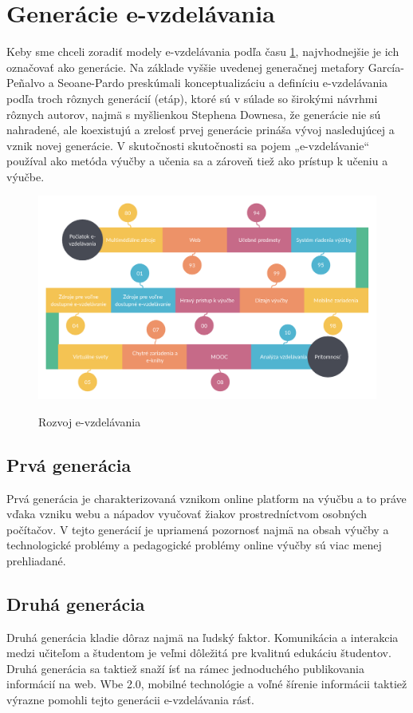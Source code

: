 \documentclass[10pt,slovak,a4paper]{article}
\begin{document}
\section{Generácie e-vzdelávania} \label{Generations}

	Keby sme chceli zoradiť modely e-vzdelávania podľa času \ref*{obrazok-casovyDiag}, najvhodnejšie je ich označovať ako generácie. Na základe vyššie uvedenej generačnej metafory García-Peñalvo a Seoane-Pardo preskúmali konceptualizáciu a definíciu e-vzdelávania podľa troch rôznych generácií (etáp), ktoré sú v súlade so širokými návrhmi rôznych autorov, najmä s myšlienkou Stephena Downesa, že generácie nie sú nahradené, ale koexistujú a zrelosť prvej generácie prináša vývoj nasledujúcej a vznik novej generácie. V skutočnosti skutočnosti sa pojem „e-vzdelávanie“ používal ako metóda výučby a učenia sa a zároveň tiež ako prístup k učeniu a výučbe.
	\cite{main}

	\begin{figure}
		\centering
		\includegraphics[width = \textwidth]{Obrazky/diagram.png}
		\caption{Rozvoj e-vzdelávania}
		\label{obrazok-casovyDiag}
		\cite{conole}
	\end{figure}

	\subsection{Prvá generácia}
	Prvá generácia je charakterizovaná vznikom online platform na výučbu a to práve vďaka vzniku webu a nápadov vyučovať žiakov prostredníctvom osobných počítačov. V tejto generácií je upriamená pozornosť najmä na obsah výučby a technologické problémy a pedagogické problémy online výučby sú viac menej prehliadané.
	\cite{main}

	\subsection{Druhá generácia}
	Druhá generácia kladie dôraz najmä na ľudský faktor. Komunikácia a interakcia medzi učiteľom a študentom je veľmi dôležitá pre kvalitnú edukáciu študentov. Druhá generácia sa taktiež snaží ísť na rámec jednoduchého publikovania informácií na web. Wbe 2.0, mobilné technológie a voľné šírenie informácii taktiež výrazne pomohli tejto generácii e-vzdelávania rásť.
	\cite{main}
	
\end{document}
